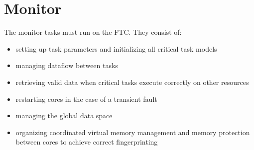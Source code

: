 
\section{Monitor}

The monitor tasks must run on the FTC. They consist of:
\begin{itemize}
  \item setting up task parameters and initializing all critical task models
  \item managing dataflow between tasks
  \item retrieving valid data when critical tasks execute correctly on other resources
  \item restarting cores in the case of a transient fault
  \item managing the global data space
  \item organizing coordinated virtual memory management and memory protection between cores to achieve correct fingerprinting
\end{itemize}
